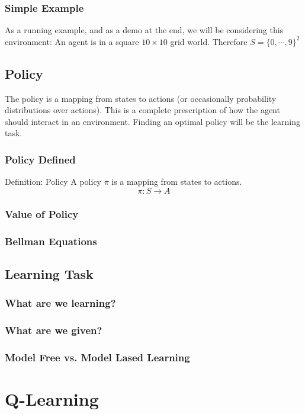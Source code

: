 \documentclass[ignorenonframetext]{beamer}
\begin{document}
\begin{frame}
	\frametitle{Simple Example}
	\begin{block}{ As a running example, and as a demo at the end, we
		will be considering this environment:}
		An agent is in a square $10\times 10$ grid world.  Therefore $S =
		\{0,\cdots,9\}^2$
	\end{block}
\end{frame}

\subsection{Policy}

The policy is a mapping from states to actions (or occasionally
probability distributions over actions).  This is a complete
prescription of how the agent should interact in an environment.
Finding an optimal policy will be the learning task.

\begin{frame}
	\frametitle{Policy Defined}
	\begin{block}{Definition: Policy}
		A policy $\pi$ is a mapping from states to actions.
		\[ \pi: S \rightarrow A \]
	\end{block}
\end{frame}

\begin{frame}
	\frametitle{Value of Policy}
\end{frame}

\begin{frame}
	\frametitle{Bellman Equations}
\end{frame}

\subsection{Learning Task}

\begin{frame}
	\frametitle{What are we learning?}
\end{frame}

\begin{frame}
	\frametitle{What are we given?}
\end{frame}

\begin{frame}
	\frametitle{Model Free vs. Model Lased Learning}
\end{frame}

\section{Q-Learning}
\end{document}
